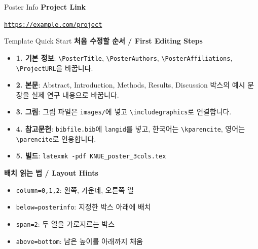 \documentclass[a0paper,portrait]{KNUE_baposter}
\newcommand{\ProjectURL}{https://example.com/project}
\begin{document}
\begin{poster}
\begin{posterbox}[name=posterinfo,column=2,row=0]{Poster Info}
\vspace{0.6em}
\footnotesize
\textbf{Project Link}

\scriptsize
\href{\ProjectURL}{\nolinkurl{\ProjectURL}}
\end{posterbox}

%
\begin{posterbox}[name=boxlayoutguide,column=2,below=posterinfo]{Template Quick Start}
\tiny
\textbf{처음 수정할 순서 / First Editing Steps}

\begin{itemize}
\item \textbf{1. 기본 정보}: \texttt{\textbackslash PosterTitle}, \texttt{\textbackslash PosterAuthors}, \texttt{\textbackslash PosterAffiliations}, \texttt{\textbackslash ProjectURL}을 바꿉니다.
\item \textbf{2. 본문}: Abstract, Introduction, Methods, Results, Discussion 박스의 예시 문장을 실제 연구 내용으로 바꿉니다.
\item \textbf{3. 그림}: 그림 파일은 \texttt{images/}에 넣고 \texttt{\textbackslash includegraphics}로 연결합니다.
\item \textbf{4. 참고문헌}: \texttt{bibfile.bib}에 \texttt{langid}를 넣고, 한국어는 \texttt{\textbackslash kparencite}, 영어는 \texttt{\textbackslash parencite}로 인용합니다.
\item \textbf{5. 빌드}: \texttt{latexmk -pdf KNUE\_poster\_3cols.tex}
\end{itemize}

\vspace{0.25em}
\textbf{배치 읽는 법 / Layout Hints}

\begin{itemize}
\item \texttt{column=0,1,2}: 왼쪽, 가운데, 오른쪽 열
\item \texttt{below=posterinfo}: 지정한 박스 아래에 배치
\item \texttt{span=2}: 두 열을 가로지르는 박스
\item \texttt{above=bottom}: 남은 높이를 아래까지 채움
\end{itemize}


\end{posterbox}
\end{poster}
\end{document}
